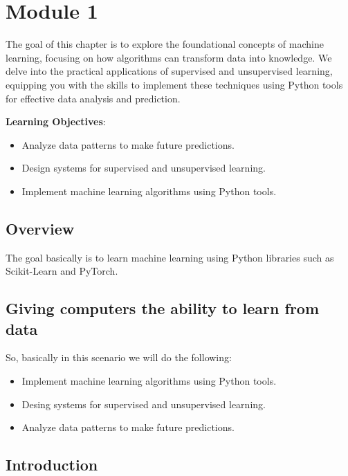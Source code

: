 \documentclass[../machine_learning_scikit.tex]{subfiles}
\begin{document}
    \chapter{Module 1}

    The goal of this chapter is to explore the foundational concepts of machine learning, focusing on how algorithms can transform data into knowledge. We delve into the practical applications of supervised and unsupervised learning, equipping you with the skills to implement these techniques using Python tools for effective data analysis and prediction.
    
    \begin{obs}
        \textbf{Learning Objectives}:
        \begin{itemize}
            \item Analyze data patterns to make future predictions.
            \item Design systems for supervised and unsupervised learning.
            \item Implement machine learning algorithms using Python tools.
        \end{itemize}
    \end{obs}
        
    \section{Overview}

    The goal basically is to learn machine learning using Python libraries such as Scikit-Learn and PyTorch.

    \section{Giving computers the ability to learn from data}

    So, basically in this scenario we will do the following:
    \begin{itemize}
        \item Implement machine learning algorithms using Python tools.
        \item Desing systems for supervised and unsupervised learning.
        \item Analyze data patterns to make future predictions.
    \end{itemize}

    \section{Introduction}
\end{document}
